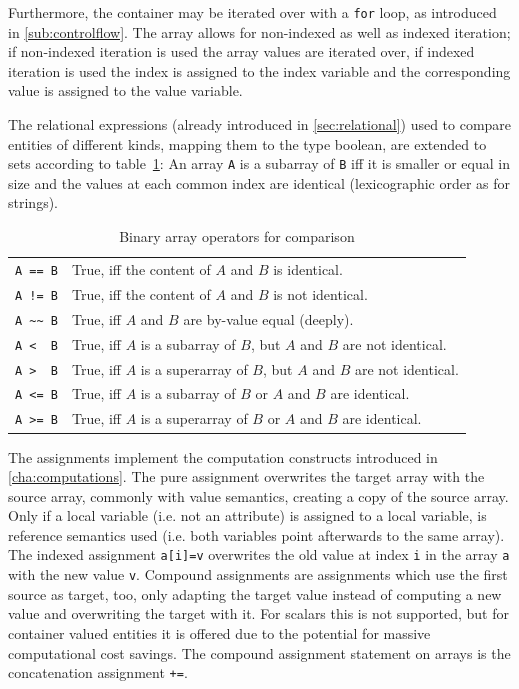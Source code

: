 Furthermore, the container may be iterated over with a \texttt{for} loop, as introduced in  \ref{sub:controlflow}.
The array allows for non-indexed as well as indexed iteration; if non-indexed iteration is used the array values are iterated over, if indexed iteration is used the index is assigned to the index variable and the corresponding value is assigned to the value variable. 

The relational expressions (already introduced in \ref{sec:relational}) used to compare entities of different kinds, mapping them to the type boolean, are extended to sets according to table~\ref{comparray}:
An array \texttt{A} is a subarray of \texttt{B} iff it is smaller or equal in size and the values at each common index are identical (lexicographic order as for strings).

\begin{table}[htbp]
  \centering
  \begin{tabularx}{\linewidth}{|l|X|}
    \hline
    \texttt{A == B} & True, iff the content of $A$ and $B$ is identical. \\
    \texttt{A != B} & True, iff the content of $A$ and $B$ is not identical. \\
    \texttt{A \textasciitilde\textasciitilde\ B} & True, iff $A$ and $B$ are by-value equal (deeply).\\
    \texttt{A <\ \ B} & True, iff $A$ is a subarray of $B$, but $A$ and $B$ are not identical. \\
    \texttt{A >\ \ B} & True, iff $A$ is a superarray of $B$, but $A$ and $B$ are not identical. \\
    \texttt{A <= B} & True, iff $A$ is a subarray of $B$ or $A$ and $B$ are identical. \\
    \texttt{A >= B} & True, iff $A$ is a superarray of $B$ or $A$ and $B$ are identical. \\
    \hline
  \end{tabularx}
  \caption{Binary array operators for comparison}
  \label{comparray}
\end{table}

The assignments implement the computation constructs introduced in \ref{cha:computations}.
The pure assignment overwrites the target array with the source array, commonly with value semantics, creating a copy of the source array. Only if a local variable (i.e. not an attribute) is assigned to a local variable, is reference semantics used  (i.e. both variables point afterwards to the same array).
The indexed assignment \texttt{a[i]=v} overwrites the old value at index \texttt{i} in the array \texttt{a} with the new value \texttt{v}.
Compound assignments are assignments which use the first source as target, too,
only adapting the target value instead of computing a new value and overwriting the target with it.
For scalars this is not supported, but for container valued entities it is offered due to the potential for massive computational cost savings.
The compound assignment statement on arrays is the concatenation assignment \verb#+=#.

